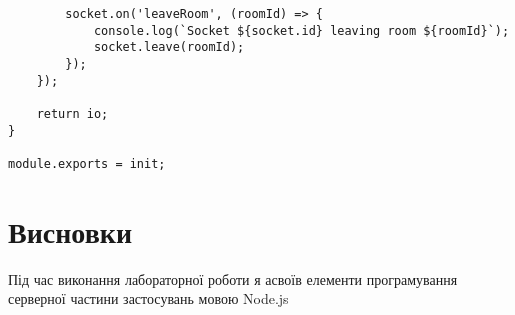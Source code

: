 \documentclass{article}
\begin{document}
\begin{normalsize}
\begin{lstlisting}
		socket.on('leaveRoom', (roomId) => {
			console.log(`Socket ${socket.id} leaving room ${roomId}`);
			socket.leave(roomId);
		});
	});
	
	return io;
}

module.exports = init;
\end{lstlisting}


\section*{Висновки}
Під час виконання лабораторної роботи я асвоїв елементи програмування серверної частини застосувань мовою Node.js
	    
\end{normalsize}
\end{document}
